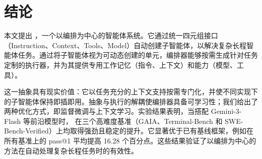 \section{结论}
本文提出 \our{}，一个以编排为中心的智能体系统。它通过统一四元组接口（Instruction、Context、Tools、Model）自动创建子智能体，以解决复杂长程智能体任务。通过将子智能体视为可动态创建的单元，编排器能够按需生成针对任务定制的执行器，并为其提供专用工作记忆（指令、上下文）和能力（模型、工具）。

这一抽象具有现实价值：它以任务充分的上下文支持按需专门化，并使不同实现下的子智能体保持即插即用。抽象与执行的解耦使编排器具备可学习性；我们给出了两种优化方式，即监督微调与上下文学习。实验结果表明，当搭配 Gemini-3-Flash 等前沿模型时，\our{} 在三个高难度基准（GAIA、Terminal-Bench 和 SWE-Bench-Verified）上均取得强劲且稳定的提升。它显著优于已有基线框架，例如在所有基准上的 pass@1 平均提高 16.28 个百分点。这些结果验证了以编排为中心的方法在自动处理复杂长程任务时的有效性。
